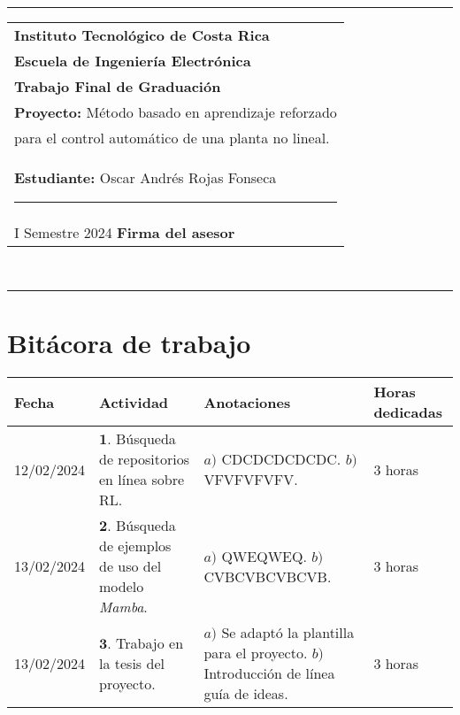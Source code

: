 \documentclass[12pt]{article}
\begin{document}
\hfill\\
\rule{\textwidth}{1.5pt}

\begin{minipage}[t]{85mm}
  \begin{tabular}{l}
    \textbf{\large Instituto Tecnológico de Costa Rica} \\  
    \textbf{Escuela de Ingeniería Electrónica} \\
    \textbf{Trabajo Final de Graduación} \\
    \textbf{Proyecto:} Método basado en aprendizaje reforzado \\para el control automático de una planta no lineal. \\
    \textbf{Estudiante:} Oscar Andrés Rojas Fonseca \hspace{3cm}\rule{4.5cm}{1.5pt}\\
    I Semestre 2024 \hspace{8.5cm}\textbf{Firma del asesor}
  \end{tabular}
\end{minipage}
\hfill\\
\rule{\textwidth}{1.5pt}


\section*{Bitácora de trabajo}

\begin{minipage}[h]{\textwidth}
	\centering
	\begin{tabularx}{\textwidth}{|p{2cm}|X|X|p{2cm}|} 
		\hline
		\rowcolor{encabezado}
		\textbf{Fecha} & 
		\textbf{Actividad} & 
		\textbf{Anotaciones} & 
		\textbf{Horas dedicadas} \\ \hline
		12/02/2024 & 
		$\mathbf{1}.$ Búsqueda de repositorios en línea sobre RL. & 
		$a)$ CDCDCDCDCDC. \newline $b)$ VFVFVFVFV. \newline & 
		3 horas \\
	 	13/02/2024 & 
	 	$\mathbf{2}.$ Búsqueda de ejemplos de uso del modelo \textit{Mamba}. &
	 	$a)$ QWEQWEQ. \newline $b)$ CVBCVBCVBCVB. \newline & 
	 	3 horas \\
	 	13/02/2024 & 
	 	$\mathbf{3}.$ Trabajo en la tesis del proyecto. & 
	 	$a)$ Se adaptó la plantilla para el proyecto. \newline $b)$ Introducción de línea guía de ideas. \newline & 
	 	3 horas \\
	 	
	 	\hline
	\end{tabularx}
\end{minipage}	 	
	 	
\end{document}
